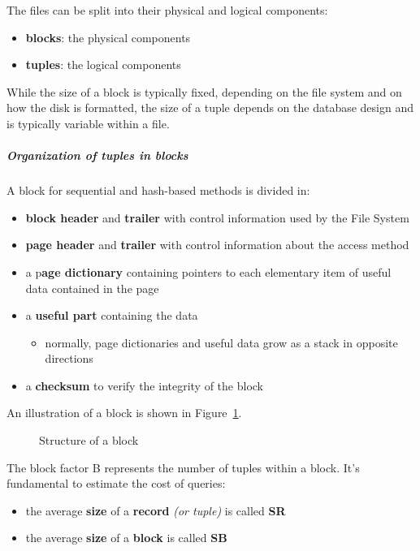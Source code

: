 \documentclass[english]{article}
\begin{document}
The files can be split into their physical and logical components:

\begin{itemize}
  \item \textbf{blocks}: the physical components
  \item \textbf{tuples}: the logical components
\end{itemize}

While the size of a block is typically fixed, depending on the file system and on how the disk is formatted, the size of a tuple depends on the database design and is typically variable within a file.

\subparagraph*{Organization of tuples in blocks}

A block for sequential and hash-based methods is divided in:

\begin{itemize}
  \item \textbf{block header} and \textbf{trailer} with control information used by the File System
  \item \textbf{page header} and \textbf{trailer} with control information about the access method
  \item a p\textbf{age dictionary} containing pointers to each elementary item of useful data contained in the page
  \item a \textbf{useful part} containing the data
        \begin{itemize}
          \item normally, page dictionaries and useful data grow as a stack in opposite directions
        \end{itemize}
  \item a \textbf{checksum} to verify the integrity of the block
\end{itemize}

An illustration of a block is shown in Figure~\ref{fig:block-structure}.

\begin{figure}[htbp]
  \centering
  \bigskip
  \caption{Structure of a block}
  \label{fig:block-structure}
  \bigskip
\end{figure}

\bigskip
The block factor B represents the number of tuples within a block.
It's fundamental to estimate the cost of queries:

\begin{itemize}
  \item the average \textbf{size} of a \textbf{record} \textit{(or tuple)} is called \textbf{SR}
  \item the average \textbf{size} of a \textbf{block} is called \textbf{SB}
\end{itemize}
\end{document}
